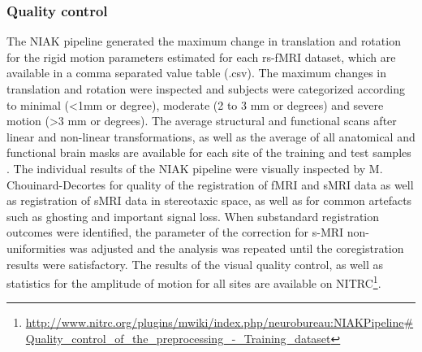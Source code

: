 \documentclass[preprint,12pt,3p]{elsarticle}
\begin{document}




\subsubsection{Quality control}

The NIAK pipeline generated the maximum change in translation and rotation for the rigid motion parameters estimated for each rs-fMRI dataset, which are available in a comma separated value table (.csv). The maximum changes in translation and rotation were inspected and subjects were categorized according to minimal (<1mm or degree), moderate (2 to 3 mm or degrees) and severe motion (>3 mm or degrees). The average structural and functional scans after linear and non-linear transformations, as well as the average of all anatomical and functional brain masks are available for each site of the training and test samples \cite{lavoie2012integration}. The individual results of the NIAK pipeline were visually inspected by M. Chouinard-Decortes for quality of the registration of fMRI and sMRI data as well as registration of sMRI data in stereotaxic space, as well as for common artefacts such as ghosting and important signal loss. When substandard registration outcomes were identified, the parameter of the correction for s-MRI non-uniformities was adjusted and the analysis was repeated until the coregistration results were satisfactory. The results of the visual quality control, as well as statistics for the amplitude of motion for all sites are available on NITRC\footnote{\url{http://www.nitrc.org/plugins/mwiki/index.php/neurobureau:NIAKPipeline#Quality_control_of_the_preprocessing_-_Training_dataset}}.

\end{document}
